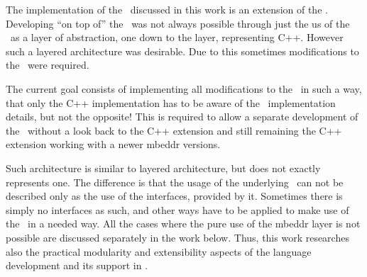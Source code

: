 The implementation of the \cpppl\ discussed in this work is an extension of the \mbp. 
Developing ``on top of'' the \mbp\ was not always possible through just the us of the \mbp\ 
as a layer of abstraction, one down to the layer, representing C++. However such a layered architecture
was desirable. Due to this sometimes modifications to the \mbp\ were required. 

The current goal consists of implementing all modifications to the \mbp\ in such a way, that only 
the C++ implementation has to be aware of the \mbp\ implementation details, but not the opposite! 
This is required to allow a separate development of the  \mbp\ without a look back to the C++ extension 
and still remaining the C++ extension working with a newer mbeddr versions. 

Such architecture is similar to layered architecture, but does not exactly represents one. The difference
is that the usage of the underlying \mbp\ can not be described only as the use of the interfaces, provided
by it. Sometimes there is simply no interfaces as such, and other ways have to be applied to make use of the
\mbp\ in a needed way. All the cases where the pure use of the mbeddr layer is not possible are discussed
separately in the work below. Thus, this work researches also the practical modularity and extensibility aspects of 
the language development and its support in \jbmps.